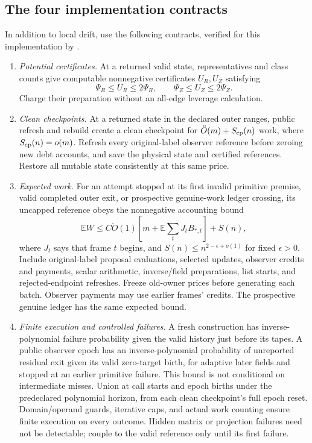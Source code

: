 \documentclass[11pt]{article}
\theoremstyle{remark}
\newcommand{\Ex}{\mathbb E}
\renewcommand{\O}{\ddot{O}}
\begin{document}
\subsection{The four implementation contracts}

In addition to local drift, use the following contracts, verified for this
implementation by .

\begin{enumerate}
\item \emph{Potential certificates.}
At a returned valid state, representatives and class counts give
computable nonnegative certificates $U_R,U_Z$ satisfying
\[
 \Psi_R\le U_R\le2\Psi_R,\qquad
 \Psi_Z\le U_Z\le2\Psi_Z.
\]
Charge their preparation without an all-edge leverage calculation.

\item \emph{Clean checkpoints.}
At a returned state in the declared outer ranges, public refresh and rebuild
create a clean checkpoint for $\O(m)+S_{\rm cp}(n)$ work, where $S_{\rm
cp}(n)=o(m)$.
Refresh every original-label observer reference before zeroing new debt
accounts, and save the physical state and certified references.
Restore all mutable state consistently at this same price.

\item \emph{Expected work.}
For an attempt stopped at its first invalid primitive premise, valid completed
outer exit, or prospective genuine-work ledger crossing, its uncapped reference
obeys the nonnegative accounting bound
\begin{equation}
 \Ex W\le C\O(1)
 \left[m+\Ex\sum_tJ_tB_{*,t}\right]+S(n),
 \label{eq:ram-phase-work-contract}
\end{equation}
where $J_t$ says that frame $t$ begins, and $S(n)\le n^{2-\epsilon+o(1)}$
for fixed $\epsilon>0$.
Include original-label proposal evaluations, selected updates, observer credits
and payments, scalar arithmetic, inverse/field preparations, list starts, and
rejected-endpoint refreshes.
Freeze old-owner prices before generating each batch.
Observer payments may use earlier frames' credits.
The prospective genuine ledger has the same expected bound.

\item \emph{Finite execution and controlled failures.}
A fresh construction has inverse-polynomial failure probability given the valid
history just before its tapes.
A public observer epoch has an inverse-polynomial probability of unreported
residual exit given its valid zero-target birth, for adaptive later fields and
stopped at an earlier primitive failure.
This bound is not conditional on intermediate misses.
Union at call starts and epoch births under the predeclared polynomial horizon,
from each clean checkpoint's full epoch reset.
Domain/operand guards, iterative caps, and actual work counting ensure finite
execution on every outcome.
Hidden matrix or projection failures need not be detectable; couple to the valid
reference only until its first failure.
\end{enumerate}
\end{document}
